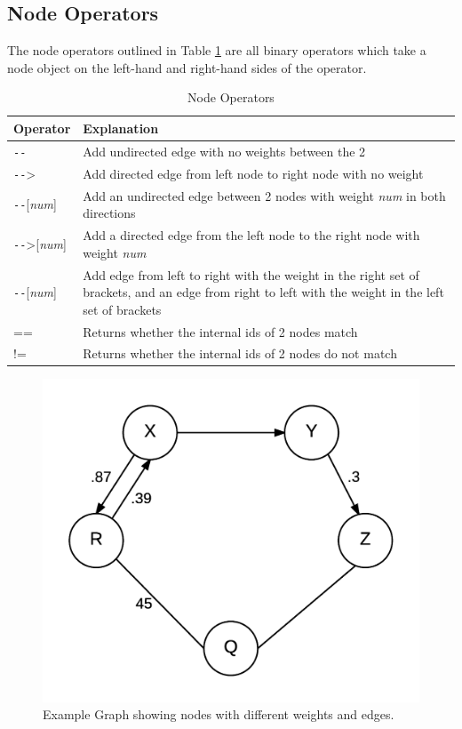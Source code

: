 \documentclass{article}
\begin{document}
\subsection{Node Operators}

The node operators outlined in Table \ref{tbl:node-ops} are all binary operators which take a node object on the left-hand and right-hand sides of the operator.

\begin{table}[H]
\centering
\begin{tabular}{| p{1.5in} | p{2.75in} |}
\hline
Operator & Explanation \\
\hline
\texttt{-{}-} & Add undirected edge with no weights between the 2 \\
\hline
\texttt{-{}-}> & Add directed edge from left node to right node with no weight \\
\hline
\texttt{-{}-}[\emph{num}] & Add an undirected edge between 2 nodes with weight \emph{num} in both directions \\
\hline
\texttt{-{}-}>[\emph{num}] & Add a directed edge from the left node to the right node with weight \emph{num} \\
\hline
[\emph{num}]\texttt{-{}-}[\emph{num}] & Add edge from left to right with the weight in the right set of brackets, and an edge from right to left with the weight in the left set of brackets \\
\hline
== & Returns whether the internal ids of 2 nodes match \\
\hline
!= & Returns whether the internal ids of 2 nodes do not match \\
\hline
\end{tabular}
\caption{Node Operators}
\label{tbl:node-ops}
\end{table}

\begin{figure}[H]
\centering
\includegraphics{graphs/node_operators_example.png}
\caption{Example Graph showing nodes with different weights and edges.}
\label{fig:node-ops}
\end{figure}
\end{document}
